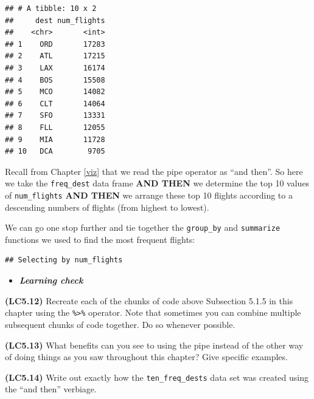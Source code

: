 \documentclass[]{tufte-book}
\newenvironment{Shaded}{\begin{snugshade}}{\end{snugshade}}
\newcommand{\KeywordTok}[1]{\textcolor[rgb]{0.13,0.29,0.53}{\textbf{{#1}}}}
\newcommand{\DataTypeTok}[1]{\textcolor[rgb]{0.13,0.29,0.53}{{#1}}}
\newcommand{\DecValTok}[1]{\textcolor[rgb]{0.00,0.00,0.81}{{#1}}}
\newcommand{\StringTok}[1]{\textcolor[rgb]{0.31,0.60,0.02}{{#1}}}
\newcommand{\NormalTok}[1]{{#1}}
\newenvironment{rmdblock}[1]
  {\begin{shaded*}
  \begin{itemize}
  \renewcommand{\labelitemi}{
    \raisebox{-.7\height}[0pt][0pt]{
    }
  }
  \item
  }
  {
  \end{itemize}
  \end{shaded*}
  }
\newenvironment{learncheck}
  {\begin{rmdblock}{warning}}
  {\end{rmdblock}}
\begin{document}
\begin{verbatim}
## # A tibble: 10 x 2
##     dest num_flights
##    <chr>       <int>
## 1    ORD       17283
## 2    ATL       17215
## 3    LAX       16174
## 4    BOS       15508
## 5    MCO       14082
## 6    CLT       14064
## 7    SFO       13331
## 8    FLL       12055
## 9    MIA       11728
## 10   DCA        9705
\end{verbatim}

Recall from Chapter \ref{viz} that we read the pipe operator as ``and
then''. So here we take the \texttt{freq\_dest} data frame \textbf{AND
THEN} we determine the top 10 values of \texttt{num\_flights}
\textbf{AND THEN} we arrange these top 10 flights according to a
descending numbers of flights (from highest to lowest).

We can go one stop further and tie together the \texttt{group\_by} and
\texttt{summarize} functions we used to find the most frequent flights:

\begin{Shaded}
\end{Shaded}

\begin{verbatim}
## Selecting by num_flights
\end{verbatim}

\begin{learncheck}
\textbf{\emph{Learning check}}
\end{learncheck}

\textbf{(LC5.12)} Recreate each of the chunks of code above Subsection
5.1.5 in this chapter using the \texttt{\%\textgreater{}\%} operator.
Note that sometimes you can combine multiple subsequent chunks of code
together. Do so whenever possible.

\textbf{(LC5.13)} What benefits can you see to using the pipe instead of
the other way of doing things as you saw throughout this chapter? Give
specific examples.

\textbf{(LC5.14)} Write out exactly how the \texttt{ten\_freq\_dests}
data set was created using the ``and then'' verbiage.
\end{document}
